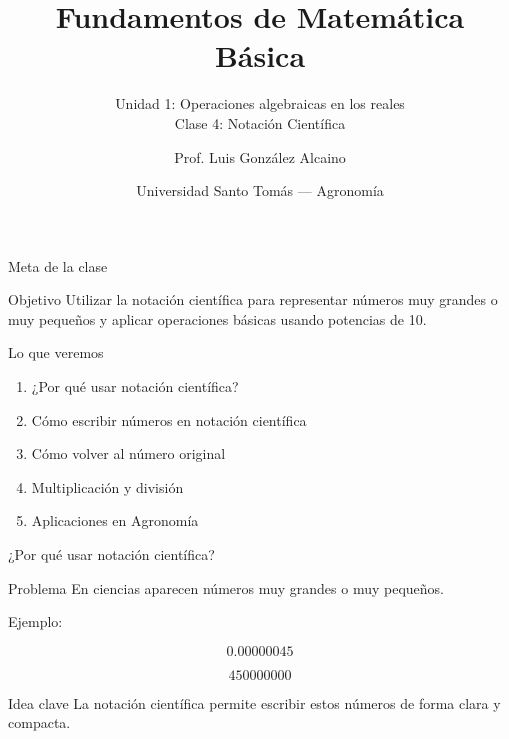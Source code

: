 \documentclass[aspectratio=169,10pt,handout]{beamer}
\title{Fundamentos de Matemática Básica}
\subtitle{Unidad 1: Operaciones algebraicas en los reales\\Clase 4: Notación Científica}
\author{Prof. Luis González Alcaino}
\date{Universidad Santo Tomás — Agronomía}
\newcommand{\pp}{\pause}
\begin{document}
	
	\begin{frame}
		\titlepage
	\end{frame}
	
	\begin{frame}{Meta de la clase}
		
		\begin{block}{Objetivo}
			Utilizar la notación científica para representar números muy grandes o muy pequeños y aplicar operaciones básicas usando potencias de 10.
		\end{block}
		
		\pp
		
		\begin{block}{Lo que veremos}
			\begin{enumerate}
				\item ¿Por qué usar notación científica?
				\item Cómo escribir números en notación científica
				\item Cómo volver al número original
				\item Multiplicación y división
				\item Aplicaciones en Agronomía
			\end{enumerate}
			
		\end{block}
		
	\end{frame}
	
	\begin{frame}{¿Por qué usar notación científica?}
		
		\begin{block}{Problema}
			En ciencias aparecen números muy grandes o muy pequeños.
		\end{block}
		
		\pp
		
		Ejemplo:
		
		\[
		0.00000045
		\]
		
		\pp
		
		\[
		450000000
		\]
		
		\pp
		
		\begin{exampleblock}{Idea clave}
			La notación científica permite escribir estos números de forma clara y compacta.
		\end{exampleblock}
		
	\end{frame}
	
\end{document}
